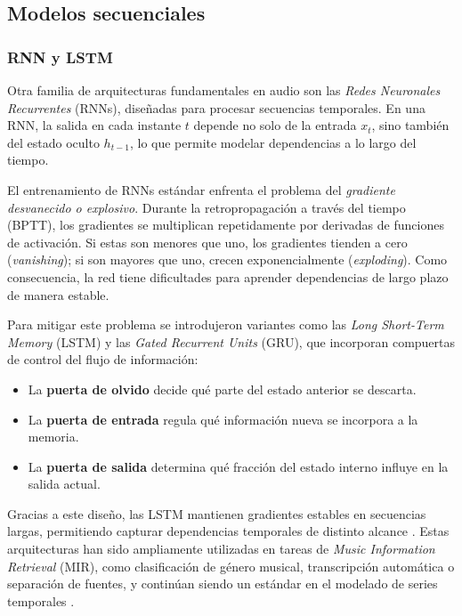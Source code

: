 \subsection{Modelos secuenciales}
\label{sec:dl_seq_bayes}

\subsubsection*{RNN y LSTM}

Otra familia de arquitecturas fundamentales en audio son las \emph{Redes Neuronales Recurrentes} (RNNs), diseñadas para procesar secuencias temporales.  
En una RNN, la salida en cada instante $t$ depende no solo de la entrada $x_t$, sino también del estado oculto $h_{t-1}$, lo que permite modelar dependencias a lo largo del tiempo.  

El entrenamiento de RNNs estándar enfrenta el problema del \emph{gradiente desvanecido o explosivo}.  
Durante la retropropagación a través del tiempo (BPTT), los gradientes se multiplican repetidamente por derivadas de funciones de activación.  
Si estas son menores que uno, los gradientes tienden a cero (\emph{vanishing}); si son mayores que uno, crecen exponencialmente (\emph{exploding}).  
Como consecuencia, la red tiene dificultades para aprender dependencias de largo plazo de manera estable.

Para mitigar este problema se introdujeron variantes como las \emph{Long Short-Term Memory} (LSTM) y las \emph{Gated Recurrent Units} (GRU), que incorporan compuertas de control del flujo de información:
\begin{itemize}
	\item La \textbf{puerta de olvido} decide qué parte del estado anterior se descarta.  
	\item La \textbf{puerta de entrada} regula qué información nueva se incorpora a la memoria.  
	\item La \textbf{puerta de salida} determina qué fracción del estado interno influye en la salida actual.  
\end{itemize}

Gracias a este diseño, las LSTM mantienen gradientes estables en secuencias largas, permitiendo capturar dependencias temporales de distinto alcance \cite{DL_MusicReview}.  
Estas arquitecturas han sido ampliamente utilizadas en tareas de \emph{Music Information Retrieval} (MIR), como clasificación de género musical, transcripción automática o separación de fuentes, y continúan siendo un estándar en el modelado de series temporales \cite{DL_MusicReview}.


